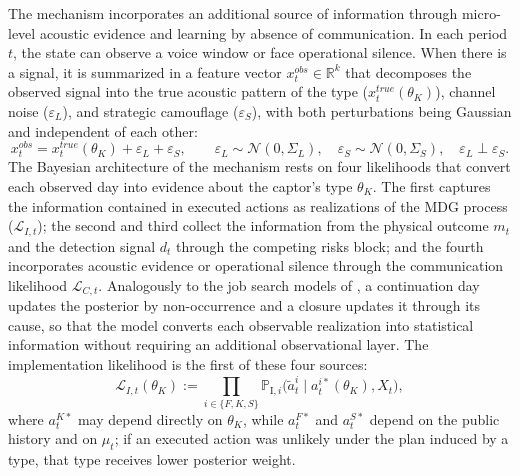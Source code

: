 \documentclass[review,authoryear,12pt]{elsarticle}
\theoremstyle{plain}
\theoremstyle{definition}
\newcommand{\1}{\mathbf{1}}
\newcommand{\ProbI}[1]{\mathbb{P}_{\mathrm{I},#1}}
\begin{document}
The mechanism incorporates an additional source of information through micro-level acoustic evidence and learning by absence of communication. In each period $t$, the state can observe a voice window or face operational silence. When there is a signal, it is summarized in a feature vector $x_t^{obs}\in\mathbb{R}^k$ that decomposes the observed signal into the true acoustic pattern of the type ($x_t^{true}(\theta_K)$), channel noise ($\varepsilon_L$), and strategic camouflage ($\varepsilon_S$), with both perturbations being Gaussian and independent of each other:
\begin{equation}
x_t^{obs}=x_t^{true}(\theta_K)+\varepsilon_L+\varepsilon_S,\qquad\varepsilon_L\sim\mathcal{N}(0,\Sigma_L),\quad\varepsilon_S\sim\mathcal{N}(0,\Sigma_S),\quad\varepsilon_L\perp\varepsilon_S.
\label{eq:voz-descomp}
\end{equation}
The Bayesian architecture of the mechanism rests on four likelihoods that convert each observed day into evidence about the captor's type $\theta_K$. The first captures the information contained in executed actions as realizations of the MDG process ($\mathcal{L}_{I,t}$); the second and third collect the information from the physical outcome $m_t$ and the detection signal $d_t$ through the competing risks block; and the fourth incorporates acoustic evidence or operational silence through the communication likelihood $\mathcal{L}_{C,t}$. Analogously to the job search models of \citet{McCall1970}, a continuation day updates the posterior by non-occurrence and a closure updates it through its cause, so that the model converts each observable realization into statistical information without requiring an additional observational layer. The implementation likelihood is the first of these four sources:
\begin{equation}
\mathcal{L}_{I,t}(\theta_K):=\prod_{i\in\{F,K,S\}}\ProbI{i}\!\bigl(\tilde{a}_t^i\mid a_t^{i\ast}(\theta_K),X_t\bigr),
\label{eq:LI-atilde}
\end{equation}
where $a_t^{K\ast}$ may depend directly on $\theta_K$, while $a_t^{F\ast}$ and $a_t^{S\ast}$ depend on the public history and on $\mu_t$; if an executed action was unlikely under the plan induced by a type, that type receives lower posterior weight.
\end{document}
